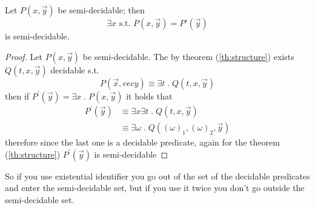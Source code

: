 \begin{theorem}
  Let $ P(x,\vec{y}) $ be semi-decidable; then
  \[
    \exists x \mbox{ s.t. } P(x,\vec{y}) = P'(\vec{y})
  \]
  is semi-decidable.

  \begin{proof}
    Let $P(x,\vec{y})$ be semi-decidable. The by theorem
    (\ref{th:structure}) exists $Q(t,x,\vec{y})$ decidable s.t.
    \[
      P(\vec{x}, vec{y}) \equiv \exists t \; . \; Q(t,x,\vec{y})
    \]
    then if $P^\prime(\vec{y}) = \exists x \; . \; P(x, \vec{y})$ it
    holds that
    \[
      \begin{split}
        P^\prime(\vec{y}) &\equiv \exists x \exists t \; . \;
        Q(t,x,\vec{y}) \\
        &\equiv \exists \omega \; . \; Q((\omega)_1, (\omega)_2, \vec{y})
      \end{split}
    \]
    therefore since the last one is a decidable predicate, again for
    the theorem (\ref{th:structure}) $P^\prime(\vec{y})$ is
    semi-decidable
  \end{proof}
\end{theorem}

So if you use existential identifier you go out of the set of the
decidable predicates and enter the semi-decidable set, but if you use
it twice you don't go outside the semi-decidable set.

